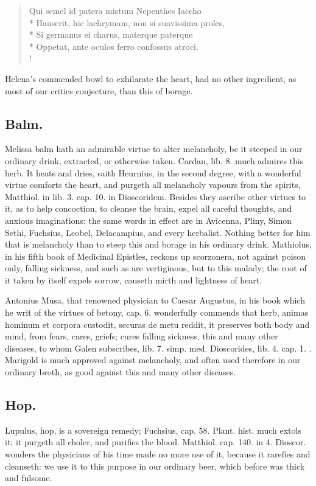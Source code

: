 {\begin{latin}
\begin{verse}
Qui semel id patera mistum Nepenthes Iaccho\\*
Hauserit, hic lachrymam, non si suavissima proles,\\*
Si germanus ei charus, materque paterque\\*
Oppetat, ante oculos ferro confossus atroci.\\!
\end{verse}
\end{latin}

Helena's commended bowl to exhilarate the heart, had no other
ingredient, as most of our critics conjecture, than this of borage.
\subsection{Balm.}
Melissa balm hath an admirable virtue to alter melancholy, be
it steeped in our ordinary drink, extracted, or otherwise taken.
Cardan, lib. 8. much admires this herb. It heats and dries, saith
 Heurnius, in the second degree, with a wonderful virtue comforts
the heart, and purgeth all melancholy vapours from the spirits,
Matthiol. in lib. 3. cap. 10. in Dioscoridem. Besides they ascribe
other virtues to it, as to help concoction, to cleanse the brain,
expel all careful thoughts, and anxious imaginations: the same words in
effect are in Avicenna, Pliny, Simon Sethi, Fuchsius, Leobel,
Delacampius, and every herbalist. Nothing better for him that is
melancholy than to steep this and borage in his ordinary drink.
Mathiolus, in his fifth book of Medicinal Epistles, reckons up
scorzonera, not against poison only, falling sickness, and such
as are vertiginous, but to this malady; the root of it taken by itself
expels sorrow, causeth mirth and lightness of heart.

Antonius Musa, that renowned physician to Caesar Augustus, in his book
which he writ of the virtues of betony, cap. 6. wonderfully commends
that herb, animas hominum et corpora custodit, securas de metu reddit,
it preserves both body and mind, from fears, cares, griefs; cures
falling sickness, this and many other diseases, to whom Galen
subscribes, lib. 7. simp. med. Dioscorides, lib. 4. cap. 1. \etc{}.
Marigold is much approved against melancholy, and often used therefore
in our ordinary broth, as good against this and many other diseases.

\subsection{Hop.}
Lupulus, hop, is a sovereign remedy; Fuchsius, cap. 58. Plant.
hist. much extols it; it purgeth all choler, and purifies the
blood. Matthiol. cap. 140. in 4. Dioscor. wonders the physicians of his
time made no more use of it, because it rarefies and cleanseth: we use
it to this purpose in our ordinary beer, which before was thick and
fulsome.

}
